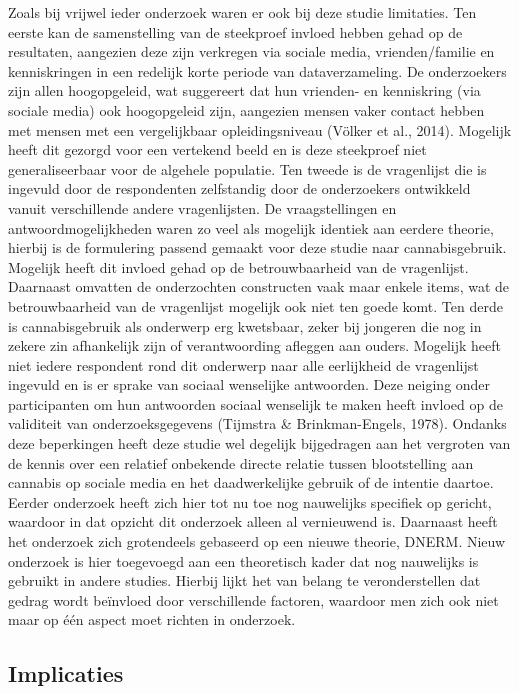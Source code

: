 \documentclass[
  letterpaper,
  DIV=11,
  numbers=noendperiod]{scrartcl}
\begin{document}
Zoals bij vrijwel ieder onderzoek waren er ook bij deze studie
limitaties. Ten eerste kan de samenstelling van de steekproef invloed
hebben gehad op de resultaten, aangezien deze zijn verkregen via sociale
media, vrienden/familie en kenniskringen in een redelijk korte periode
van dataverzameling. De onderzoekers zijn allen hoogopgeleid, wat
suggereert dat hun vrienden- en kenniskring (via sociale media) ook
hoogopgeleid zijn, aangezien mensen vaker contact hebben met mensen met
een vergelijkbaar opleidingsniveau (Völker et al., 2014). Mogelijk heeft
dit gezorgd voor een vertekend beeld en is deze steekproef niet
generaliseerbaar voor de algehele populatie. Ten tweede is de
vragenlijst die is ingevuld door de respondenten zelfstandig door de
onderzoekers ontwikkeld vanuit verschillende andere vragenlijsten. De
vraagstellingen en antwoordmogelijkheden waren zo veel als mogelijk
identiek aan eerdere theorie, hierbij is de formulering passend gemaakt
voor deze studie naar cannabisgebruik. Mogelijk heeft dit invloed gehad
op de betrouwbaarheid van de vragenlijst. Daarnaast omvatten de
onderzochten constructen vaak maar enkele items, wat de betrouwbaarheid
van de vragenlijst mogelijk ook niet ten goede komt. Ten derde is
cannabisgebruik als onderwerp erg kwetsbaar, zeker bij jongeren die nog
in zekere zin afhankelijk zijn of verantwoording afleggen aan ouders.
Mogelijk heeft niet iedere respondent rond dit onderwerp naar alle
eerlijkheid de vragenlijst ingevuld en is er sprake van sociaal
wenselijke antwoorden. Deze neiging onder participanten om hun
antwoorden sociaal wenselijk te maken heeft invloed op de validiteit van
onderzoeksgegevens (Tijmstra \& Brinkman-Engels, 1978). Ondanks deze
beperkingen heeft deze studie wel degelijk bijgedragen aan het vergroten
van de kennis over een relatief onbekende directe relatie tussen
blootstelling aan cannabis op sociale media en het daadwerkelijke
gebruik of de intentie daartoe. Eerder onderzoek heeft zich hier tot nu
toe nog nauwelijks specifiek op gericht, waardoor in dat opzicht dit
onderzoek alleen al vernieuwend is. Daarnaast heeft het onderzoek zich
grotendeels gebaseerd op een nieuwe theorie, DNERM. Nieuw onderzoek is
hier toegevoegd aan een theoretisch kader dat nog nauwelijks is gebruikt
in andere studies. Hierbij lijkt het van belang te veronderstellen dat
gedrag wordt beïnvloed door verschillende factoren, waardoor men zich
ook niet maar op één aspect moet richten in onderzoek.

\hypertarget{implicaties}{%
\subsection{Implicaties}\label{implicaties}}
\end{document}
